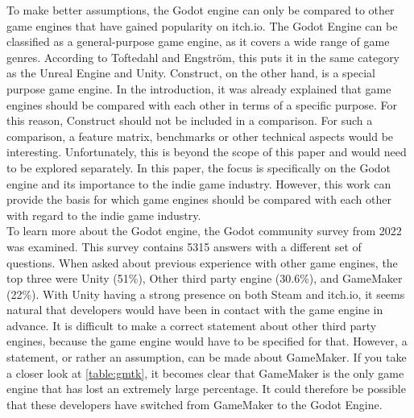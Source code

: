 To make better assumptions, the Godot engine can only be compared to other game engines that have gained popularity on itch.io.
The Godot Engine can be classified as a general-purpose game engine, as it covers a wide range of game genres.
According to Toftedahl and Engström, this puts it in the same category as the Unreal Engine and Unity.
Construct, on the other hand, is a special purpose game engine.
In the introduction, it was already explained that game engines should be compared with each other in terms of a specific purpose.
For this reason, Construct should not be included in a comparison.
For such a comparison, a feature matrix, benchmarks or other technical aspects would be interesting.
Unfortunately, this is beyond the scope of this paper and would need to be explored separately.
In this paper, the focus is specifically on the Godot engine and its importance to the indie game industry.
However, this work can provide the basis for which game engines should be compared with each other with regard to the indie game industry.\\

To learn more about the Godot engine, the Godot community survey from 2022 was examined\cite{godot-poll-results}. 
This survey contains 5315 answers with a different set of questions. 
When asked about previous experience with other game engines, the top three were Unity (51\%), Other third party engine (30.6\%), and GameMaker (22\%).
With Unity having a strong presence on both Steam and itch.io, it seems natural that developers would have been in contact with the game engine in advance. 
It is difficult to make a correct statement about other third party engines, because the game engine would have to be specified for that. 
However, a statement, or rather an assumption, can be made about GameMaker.
If you take a closer look at \autoref{table:gmtk}, it becomes clear that GameMaker is the only game engine that has lost an extremely large percentage.
It could therefore be possible that these developers have switched from GameMaker to the Godot Engine. 



